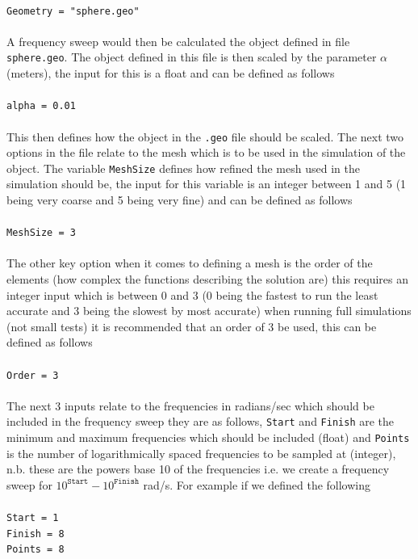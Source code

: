 \\
\texttt{Geometry = "sphere.geo"}\\
\\
A frequency sweep would then be calculated the object defined in file \texttt{sphere.geo}. The object defined in this file is then scaled by the parameter $\alpha$ (meters), the input for this is a float and can be defined as follows\\
\\
\texttt{alpha = 0.01}\\
\\
This then defines how the object in the \texttt{.geo} file should be scaled. The next two options in the file relate to the mesh which is to be used in the simulation of the object. The variable \texttt{MeshSize} defines how refined the mesh used in the simulation should be, the input for this variable is an integer between 1 and 5 (1 being very coarse and 5 being very fine) and can be defined as follows\\
\\
\texttt{MeshSize = 3}\\
\\
The other key option when it comes to defining a mesh is the order of the elements (how complex the functions describing the solution are) this requires an integer input which is between 0 and 3 (0 being the fastest to run the least accurate and 3 being the slowest by most accurate) when running full simulations (not small tests) it is recommended that an order of 3 be used, this can be defined as follows\\
\\
\texttt{Order = 3}\\
\\
The next 3 inputs relate to the frequencies in radians/sec which should be included in the frequency sweep they are as follows, \texttt{Start} and \texttt{Finish} are the minimum and maximum frequencies which should be included (float) and \texttt{Points} is the number of logarithmically spaced frequencies to be sampled at (integer), n.b. these are the powers base 10 of the frequencies i.e. we create a frequency sweep for $10^{\texttt{Start}}-10^{\texttt{Finish}}$ rad/s. For example if we defined the following\\
\\
\texttt{Start = 1}\\
\texttt{Finish = 8}\\
\texttt{Points = 8}\\
\\
